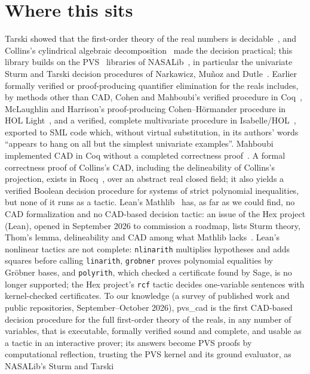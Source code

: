 \documentclass[11pt]{article}
\begin{document}
\section{Where this sits}
Tarski showed that the first-order theory of the real numbers is decidable~\cite{tarski}, and Collins's
cylindrical algebraic decomposition~\cite{collins} made the decision practical; this library builds on the
PVS~\cite{pvs} libraries of NASALib~\cite{nasalib}, in particular the univariate Sturm and Tarski decision
procedures of Narkawicz, Mu\~noz and Dutle~\cite{nmd}. Earlier formally verified or proof-producing
quantifier elimination for the reals includes, by methods other than CAD, Cohen and Mahboubi's verified procedure in
Coq~\cite{cohenmahboubi}, McLaughlin and Harrison's proof-producing Cohen--H\"ormander procedure in HOL
Light~\cite{mclaughlin}, and a verified, complete multivariate procedure in Isabelle/HOL~\cite{kosaian}, exported to SML
code which, without virtual substitution, in its authors' words ``appears to hang on all but the simplest univariate
examples''. Mahboubi implemented CAD in Coq without a
completed correctness proof~\cite{mahboubi}. A formal correctness proof of Collins's CAD, including the delineability
of Collins's projection, exists in Rocq~\cite{vermande}, over an abstract real closed field; it also yields a verified Boolean
decision procedure for systems of strict polynomial inequalities, but none of it runs as a tactic. Lean's Mathlib~\cite{mathlib} has, as far as we could find, no CAD
formalization and no CAD-based decision tactic: an issue of the Hex project (Lean), opened in September 2026 to
commission a roadmap, lists Sturm theory, Thom's lemma, delineability and CAD among what Mathlib lacks~\cite{hex}.
Lean's nonlinear tactics are not complete: \texttt{nlinarith} multiplies hypotheses and adds squares before calling
\texttt{linarith}, \texttt{grobner} proves polynomial equalities by Gr\"obner bases, and \texttt{polyrith}, which
checked a certificate found by Sage, is no longer supported; the Hex project's \texttt{rcf} tactic decides
one-variable sentences with kernel-checked certificates. To
our knowledge (a survey of published work and public repositories, September--October 2026), pvs\_cad is the first
CAD-based decision procedure for the full first-order theory of the reals, in any number of variables, that is
executable, formally verified sound and complete, and usable as a tactic in an interactive prover; its answers become
PVS proofs by computational reflection, trusting the PVS kernel and its ground evaluator, as NASALib's Sturm and Tarski
\end{document}
